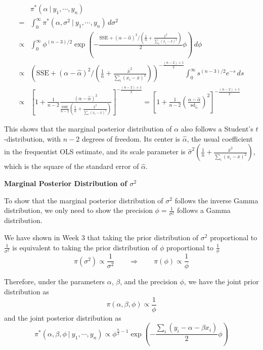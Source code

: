 \documentclass[]{book}
\theoremstyle{definition}
\theoremstyle{definition}
\theoremstyle{definition}
\theoremstyle{remark}
\begin{document}
\[
\begin{aligned}
& \pi^*(\alpha~|~y_1,\cdots,y_n) \\
= & \int_0^\infty \pi^*(\alpha, \sigma^2~|~y_1,\cdots, y_n)\, d\sigma^2 \\
\propto & \int_0^\infty \phi^{(n-3)/2}\exp\left(-\frac{\text{SSE}+(\alpha-\hat{\alpha})^2/(\frac{1}{n}+\frac{\bar{x}^2}{\sum_i (x_i-\bar{x})^2})}{2}\phi\right)\, d\phi\\
\propto & \left(\text{SSE}+(\alpha-\hat{\alpha})^2/(\frac{1}{n}+\frac{\bar{x}^2}{\sum_i (x_i-\bar{x})^2})\right)^{-\frac{(n-2)+1}{2}}\int_0^\infty s^{(n-3)/2}e^{-s}\, ds\\
\propto & \left[1+\frac{1}{n-2}\frac{(\alpha-\hat{\alpha})^2}{\frac{\text{SSE}}{n-2}\left(\frac{1}{n}+\frac{\bar{x}^2}{\sum_i (x_i-\bar{x})^2}\right)}\right]^{-\frac{(n-2)+1}{2}} = \left[1 + \frac{1}{n-2}\left(\frac{\alpha-\hat{\alpha}}{\text{sd}_{\hat{\alpha}}}\right)^2\right]^{-\frac{(n-2)+1}{2}}
\end{aligned}
\]

This shows that the marginal posterior distribution of \(\alpha\) also
follows a Student's \(t\)-distribution, with \(n-2\) degrees of freedom.
Its center is \(\hat{\alpha}\), the usual coefficient in the frequentist
OLS estimate, and its scale parameter is
\(\displaystyle \hat{\sigma}^2\left(\frac{1}{n}+\frac{\bar{x}^2}{\sum_i (x_i-\bar{x})^2}\right)\),
which is the square of the standard error of \(\hat{\alpha}\).

\textbf{Marginal Posterior Distribution of \(\sigma^2\)}

To show that the marginal posterior distribution of \(\sigma^2\) follows
the inverse Gamma distribution, we only need to show the precision
\(\displaystyle \phi = \frac{1}{\sigma^2}\) follows a Gamma
distribution.

We have shown in Week 3 that taking the prior distribution of
\(\sigma^2\) proportional to \(\displaystyle \frac{1}{\sigma^2}\) is
equivalent to taking the prior distribution of \(\phi\) proportional to
\(\displaystyle \frac{1}{\phi}\)
\[ \pi(\sigma^2) \propto \frac{1}{\sigma^2}\qquad \Longrightarrow \qquad \pi(\phi)\propto \frac{1}{\phi} \]

Therefore, under the parameters \(\alpha\), \(\beta\), and the precision
\(\phi\), we have the joint prior distribution as
\[ \pi(\alpha, \beta, \phi) \propto \frac{1}{\phi} \] and the joint
posterior distribution as \[ 
\pi^*(\alpha, \beta, \phi~|~y_1,\cdots,y_n) \propto \phi^{\frac{n}{2}-1}\exp\left(-\frac{\sum_i(y_i-\alpha-\beta x_i)}{2}\phi\right) 
\]
\end{document}
